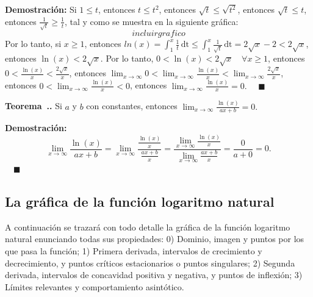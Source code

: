 \documentclass{article}
\numberwithin{equation}{section}
\newcommand{\Col}{\color{ProcessBlue}}
\newcommand{\col}[1]{\textcolor{ProcessBlue}{#1}}
\newcommand{\xinteg}[4]{\int_{#1}^{#2} \! {#3} \, \mathrm{#4}}
\newcounter{theorem}[section]
\newenvironment
{theorem}[1][]
{\vspace{0.5cm}\refstepcounter{theorem}\par\medskip\noindent\textbf{\Col Teorema~\thesection.\thetheorem. #1}\rmfamily}
{}
\newenvironment
{proof}
{\par\medskip\noindent\textbf{Demostración:}\rmfamily}
{\Col\hfill$\quad \blacksquare$\vspace{0.5cm}}
\begin{document}
\begin{proof}
    Si $1\leq t$, entonces $t\leq t^2$, entonces $\sqrt{t}\leq \sqrt{t^2}$, entonces $\sqrt{t}\leq t$, entonces $\frac{1}{\sqrt{t}}\geq\frac{1}{t}$, tal y como se muestra en la siguiente gráfica:
    $$ incluirgrafico$$
    Por lo tanto, si $x\geq 1$, entonces $ln(x)=\xinteg{1}{x}{\frac{1}{t}}{dt}\leq\xinteg{1}{x}{\frac{1}{\sqrt{t}}}{dt}=2\sqrt{x}-2<2\sqrt{x}$, entonces $\ln(x)<2\sqrt{x}$. Por lo tanto, $0<\ln(x)<2\sqrt{x} \quad \forall x\geq 1$, entonces $0<\frac{\ln(x)}{x}<\frac{2\sqrt{x}}{x}$, entonces $\lim_{x\to\infty}0<\lim_{x\to\infty}\frac{\ln(x)}{x}<\lim_{x\to\infty}\frac{2\sqrt{x}}{x}$, entonces $0<\lim_{x\to\infty}\frac{\ln(x)}{x}<0$, entonces $\lim_{x\to\infty}\frac{\ln(x)}{x}=0.$
\end{proof}

\begin{theorem}
    Si $a$ y $b$ con constantes, entonces $\lim_{x\to\infty}\frac{\ln(x)}{ax+b}=0.$
\end{theorem}

\begin{proof}
    $$ \lim_{x\to\infty}\frac{\ln(x)}{ax+b}=\lim_{x\to\infty}\frac{\frac{\ln(x)}{x}}{\frac{ax+b}{x}}=\frac{\lim_{x\to\infty}\frac{\ln(x)}{x}}{\lim_{x\to\infty}\frac{ax+b}{x}}=\frac{0}{a+0}=0.$$
\end{proof}

\subsection{\col{La gráfica de la función logaritmo natural}}

A continuación se trazará con todo detalle la gráfica de la función logaritmo natural enunciando todas sus propiedades: 0) Dominio, imagen y puntos por los que pasa la función; 1) Primera derivada, intervalos de crecimiento y decrecimiento, y puntos críticos estacionarios o puntos singulares; 2) Segunda derivada, intervalos de concavidad positiva y negativa, y puntos de inflexión; 3) Límites relevantes y comportamiento asintótico. 
\end{document}
